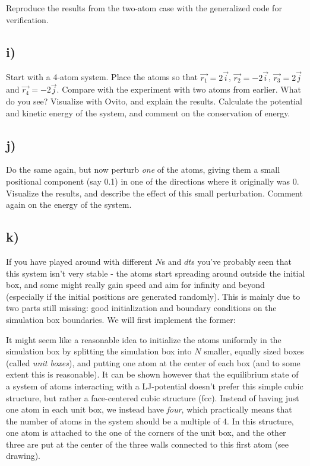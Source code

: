 \documentclass[11pt,british,a4paper]{report}
\begin{document}
Reproduce the results from the two-atom case with the generalized code for verification.

\subsection*{i)}

Start with a 4-atom system. Place the atoms so that $\vec{r_1} = 2\vec{i}$, $\vec{r_2} = -2\vec{i}$, $\vec{r_3} = 2\vec{j}$ and $\vec{r_4} = -2\vec{j}$. Compare with the experiment with two atoms
from earlier. What do you see? Visualize with Ovito, and explain the results. Calculate the potential and kinetic energy of the system, and comment on the conservation of energy.

\subsection*{j)}

Do the same again, but now perturb \textit{one} of the atoms, giving them a small positional component (say 0.1) in one of the directions where it originally was 0. Visualize the results,
and describe the effect of this small perturbation. Comment again on the energy of the system.

\subsection*{k)}

If you have played around with different $N$s and $dt$s you've probably seen that this system isn't very stable - the atoms start spreading around outside the initial box, and some might really gain speed and
aim for infinity and beyond (especially if the initial positions are generated randomly). This is mainly due to two parts still missing: good initialization and boundary conditions on
the simulation box boundaries. We will first implement the former:

It might seem like a reasonable idea to initialize the atoms uniformly in the simulation box by splitting the simulation box into $N$ smaller, equally sized boxes (called \textit{unit boxes}), and
putting one atom at the center of each box (and to some extent this is reasonable). It can be shown however that the equilibrium state of a system of atoms interacting with a LJ-potential
doesn't prefer this simple cubic structure, but rather a face-centered cubic structure (fcc). Instead of having just one atom in each unit box, we instead have \textit{four}, which
practically means that the number of atoms in the system should be a multiple of 4. In this structure, one atom is attached to the one of the corners of the unit box, and the other three are
put at the center of the three walls connected to this first atom (see drawing).
\end{document}
